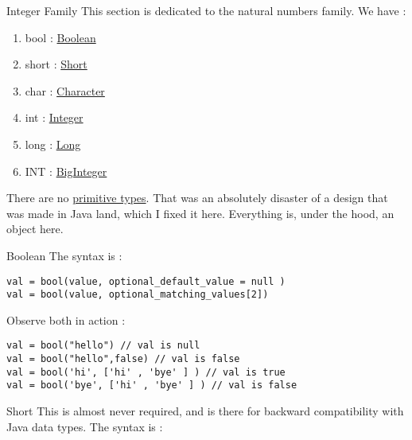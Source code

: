 \begin{section}{Integer Family}
This section is dedicated to the natural numbers family.
We have :
\begin{enumerate}
\item{bool : \href{https://docs.oracle.com/javase/8/docs/api/java/lang/Boolean.html}{Boolean} }
\item{short : \href{https://docs.oracle.com/javase/8/docs/api/java/lang/Short.html}{Short} }
\item{char :  \href{https://docs.oracle.com/javase/8/docs/api/java/lang/Character.html}{Character} }
\item{int : \href{https://docs.oracle.com/javase/8/docs/api/java/lang/Integer.html}{Integer} }
\item{long : \href{https://docs.oracle.com/javase/8/docs/api/java/lang/Long.html}{Long} }
\item{INT : \href{https://docs.oracle.com/javase/8/docs/api/java/math/BigInteger.html}{BigInteger} }
\end{enumerate}
There are no \href{https://docs.oracle.com/javase/tutorial/java/nutsandbolts/datatypes.html}{primitive types}. 
That was an absolutely disaster of a design that was made in Java land, which I fixed it here.
Everything is, under the hood, an object here. 

\begin{subsection}{Boolean}
The syntax is :
\begin{lstlisting}[style=JexlStyle]
val = bool(value, optional_default_value = null )
val = bool(value, optional_matching_values[2])
\end{lstlisting}
Observe both in action :
\begin{center}\begin{minipage}{\linewidth}
\begin{lstlisting}[style=JexlStyle]
val = bool("hello") // val is null
val = bool("hello",false) // val is false
val = bool('hi', ['hi' , 'bye' ] ) // val is true 
val = bool('bye', ['hi' , 'bye' ] ) // val is false 
\end{lstlisting}
\end{minipage}\end{center}

\end{subsection}

\begin{subsection}{Short}
This is almost never required, and is there for backward compatibility with Java data types.
The syntax is :


\end{subsection}
\end{section}
